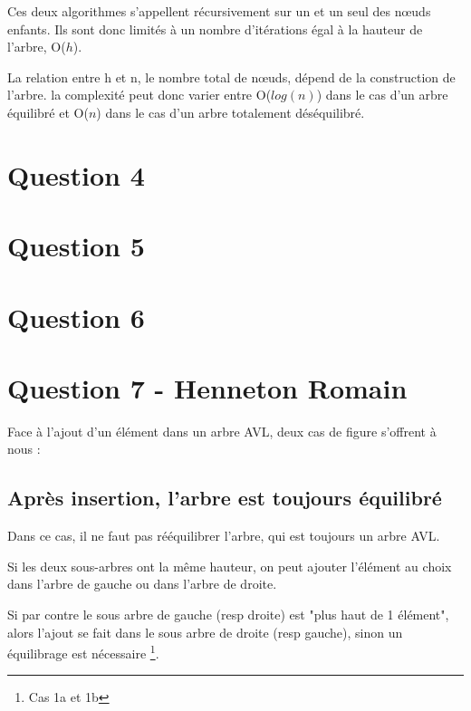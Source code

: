 \documentclass[10pt,a4paper]{article}
\begin{document}
	Ces deux algorithmes s'appellent récursivement sur un et un seul des nœuds enfants. Ils sont donc limités à un nombre d'itérations égal à la hauteur de l'arbre, O($h$).
	
	La relation entre h et n, le nombre total de nœuds, dépend de la construction de l'arbre. la complexité peut donc varier entre O($log(n)$) dans le cas d'un arbre équilibré et O($n$) dans le cas d'un arbre totalement déséquilibré.
	
\section*{Question 4}
\section*{Question 5}
\section*{Question 6}
\section*{Question 7 - Henneton Romain}
Face à l'ajout d'un élément dans un arbre AVL, deux cas de figure s'offrent à nous :
\subsection*{Après insertion, l'arbre est toujours équilibré}
Dans ce cas, il ne faut pas rééquilibrer l'arbre, qui est toujours un arbre AVL. 

Si les deux sous-arbres ont la même hauteur, on peut ajouter l'élément au choix dans l'arbre de gauche ou dans l'arbre de droite.

Si par contre le sous arbre de gauche (resp droite) est "plus haut de 1 élément", alors l'ajout se fait dans le sous arbre de droite (resp gauche), sinon un équilibrage est nécessaire \footnote{Cas 1a et 1b}.
\end{document}

